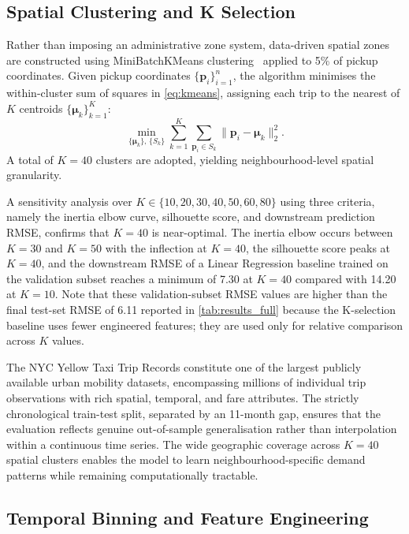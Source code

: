 \documentclass[a4paper,fleqn]{cas-dc}
\begin{document}
\subsection{Spatial Clustering and K Selection}
\label{sec:spatial}

Rather than imposing an administrative zone system, data-driven spatial zones are constructed using MiniBatchKMeans clustering~\cite{kmeans_mini} applied to 5\% of pickup coordinates.  Given pickup coordinates $\{\mathbf{p}_i\}_{i=1}^{n}$, the algorithm minimises the within-cluster sum of squares in \eqref{eq:kmeans}, assigning each trip to the nearest of $K$ centroids $\{\boldsymbol{\mu}_k\}_{k=1}^{K}$:
\begin{equation}
  \min_{\{\boldsymbol{\mu}_k\},\,\{S_k\}}
  \sum_{k=1}^{K}\sum_{\mathbf{p}_i\in S_k}
  \bigl\|\mathbf{p}_i - \boldsymbol{\mu}_k\bigr\|_2^{2}.
  \label{eq:kmeans}
\end{equation}
A total of $K=40$ clusters are adopted, yielding neighbourhood-level spatial granularity.

A sensitivity analysis over $K \in \{10, 20, 30, 40, 50, 60, 80\}$ using three criteria, namely the inertia elbow curve, silhouette score, and downstream prediction RMSE, confirms that $K = 40$ is near-optimal.  The inertia elbow occurs between $K=30$ and $K=50$ with the inflection at $K=40$, the silhouette score peaks at $K=40$, and the downstream RMSE of a Linear Regression baseline trained on the validation subset reaches a minimum of 7.30 at $K=40$ compared with 14.20 at $K=10$.  Note that these validation-subset RMSE values are higher than the final test-set RMSE of 6.11 reported in \autoref{tab:results_full} because the K-selection baseline uses fewer engineered features; they are used only for relative comparison across $K$ values.

The NYC Yellow Taxi Trip Records constitute one of the largest publicly available urban mobility datasets, encompassing millions of individual trip observations with rich spatial, temporal, and fare attributes.  The strictly chronological train-test split, separated by an 11-month gap, ensures that the evaluation reflects genuine out-of-sample generalisation rather than interpolation within a continuous time series.  The wide geographic coverage across $K{=}40$ spatial clusters enables the model to learn neighbourhood-specific demand patterns while remaining computationally tractable.

\subsection{Temporal Binning and Feature Engineering}
\end{document}
